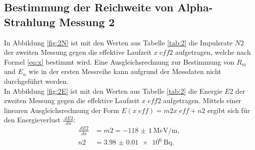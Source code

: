 \subsection{Bestimmung der Reichweite von Alpha-Strahlung Messung 2}

In Abbildung \ref{fig:2N} ist mit den Werten aus Tabelle \ref{tab:2} die Impulsrate $N2$ der zweiten Messung gegen die effektive Laufzeit $x_.{eff2}$ aufgetragen, welche nach Formel \eqref{eq:x} bestimmt wird. Eine Ausgleichsrechnung zur Bestimmung von $R_m$ und $E_\alpha$ wie in der ersten Messreihe kann aufgrund der Messdaten nicht durchgeführt werden.\\
In Abbildung \ref{fig:2E} ist mit den Werten aus Tabelle \ref{tab:2} die Energie $E2$ der zweiten Messung gegen die effektive Laufzeit $x_.{eff2}$ aufgetragen.
Mittels einer linearen Ausgleichsrechnung der Form $E(x_.{eff})=m2 x_.{eff} +n2$ ergibt sich für den Energieverlust $\frac{.dE2}{.dx}$:
\begin{align*}
\frac{.dE2}{.dx}	&= m2 = \SI{-118(1)}{\mega e\volt\per\metre}\text{,}\\
n2	&= \SI{3.98(1)e6}{\becquerel}\text{.}
\end{align*}

